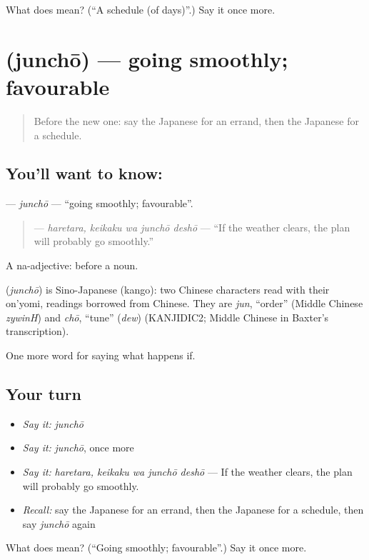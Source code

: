 \begin{tcolorbox}[breakable,colback=teal!4,colframe=teal!35!black,title={Before you move on}]
What does  mean? (\textquotedblleft{}A schedule (of days)\textquotedblright{}.) Say it once more.
\end{tcolorbox}
\section[\texorpdfstring{\ja{じゅんちょう} (junchō)}{じゅんちょう (junchō)}]{ (junchō) — going smoothly; favourable}

\label{lesson:JA-C344-junchou}



\begin{quote}
Before the new one: say the Japanese for an errand, then the Japanese for a schedule.
\end{quote}

\subsection*{You'll want to know: }
\textbf{} — \emph{junchō} — \textquotedblleft{}going smoothly; favourable\textquotedblright{}.

\begin{quote}
\textbf{ } — \emph{haretara, keikaku wa junchō deshō} — \textquotedblleft{}If the weather clears, the plan will probably go smoothly.\textquotedblright{}
\end{quote}

A na-adjective:  before a noun.

\begin{cousinweb}
\textbf{} (\emph{junchō}) is Sino-Japanese (kango): two Chinese characters read with their on'yomi, readings borrowed from Chinese. They are \emph{jun}, \textquotedblleft{}order\textquotedblright{} (Middle Chinese \emph{zywinH}) and \emph{chō}, \textquotedblleft{}tune\textquotedblright{} (\emph{dew}) (KANJIDIC2; Middle Chinese in Baxter's transcription).
\end{cousinweb}

\begin{grammarlens}[title={What you've built}]
One more word for saying what happens if.
\end{grammarlens}

\subsection*{Your turn}
\begin{itemize}
\raggedright
  \item \emph{Say it:} \emph{junchō}
  \item \emph{Say it:} \emph{junchō}, once more
  \item \emph{Say it:} \emph{haretara, keikaku wa junchō deshō} — If the weather clears, the plan will probably go smoothly.
  \item \emph{Recall:} say the Japanese for an errand, then the Japanese for a schedule, then say \emph{junchō} again
\end{itemize}

\begin{tcolorbox}[breakable,colback=teal!4,colframe=teal!35!black,title={Before you move on}]
What does  mean? (\textquotedblleft{}Going smoothly; favourable\textquotedblright{}.) Say it once more.
\end{tcolorbox}
